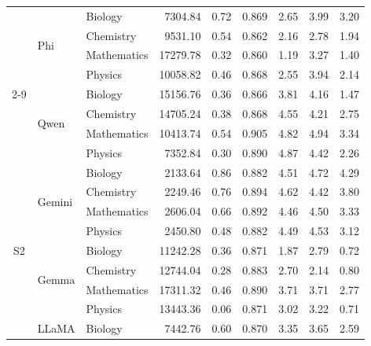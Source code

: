 ﻿\documentclass[a4paper,conference,10pt]{IEEEtran}
\begin{document}
\begin{table}[!t]
\begin{tabular}{|c|l|l|r|r|r|r|r|r|}
  & \multirow{4}{*}{Phi}    & Biology     &  7304.84         & 0.72 & 0.869 & 2.65          & 3.99 & 3.20 \\
  &                         & Chemistry   &  9531.10         & 0.54          & 0.862 & 2.16          & 2.78 & 1.94 \\
  &                         & Mathematics & 17279.78         & 0.32          & 0.860 & 1.19          & 3.27 & 1.40 \\
  &                         & Physics     & 10058.82         & 0.46          & 0.868 & 2.55          & 3.94 & 2.14 \\ \cline{2-9}
  & \multirow{4}{*}{Qwen}   & Biology     & 15156.76         & 0.36          & 0.866 & 3.81          & 4.16 & 1.47 \\
  &                         & Chemistry   & 14705.24         & 0.38          & 0.868 & 4.55 & 4.21 & 2.75 \\
  &                         & Mathematics & 10413.74         & 0.54          & 0.905 & 4.82 & 4.94 & 3.34 \\
  &                         & Physics     &  7352.84         & 0.30          & 0.890 & 4.87 & 4.42 & 2.26 \\
\hline
\multirow{20}{*}{S2}
  & \multirow{4}{*}{Gemini} & Biology     & 2133.64 & 0.86 & 0.882 & 4.51 & 4.72 & 4.29 \\
  &                         & Chemistry   & 2249.46 & 0.76 & 0.894 & 4.62 & 4.42          & 3.80 \\
  &                         & Mathematics & 2606.04 & 0.66          & 0.892 & 4.46 & 4.50          & 3.33 \\
  &                         & Physics     & 2450.80 & 0.48          & 0.882 & 4.49 & 4.53          & 3.12 \\ \cline{2-9}
  & \multirow{4}{*}{Gemma}  & Biology     & 11242.28         & 0.36          & 0.871 & 1.87          & 2.79 & 0.72 \\
  &                         & Chemistry   & 12744.04         & 0.28          & 0.883 & 2.70          & 2.14 & 0.80 \\
  &                         & Mathematics & 17311.32         & 0.46          & 0.890 & 3.71          & 3.71 & 2.77 \\
  &                         & Physics     & 13443.36         & 0.06          & 0.871 & 3.02          & 3.22 & 0.71 \\ \cline{2-9}
  & \multirow{4}{*}{LLaMA}  & Biology     &  7442.76         & 0.60          & 0.870 & 3.35          & 3.65 & 2.59 \\

\end{tabular}
\end{table}
\end{document}
